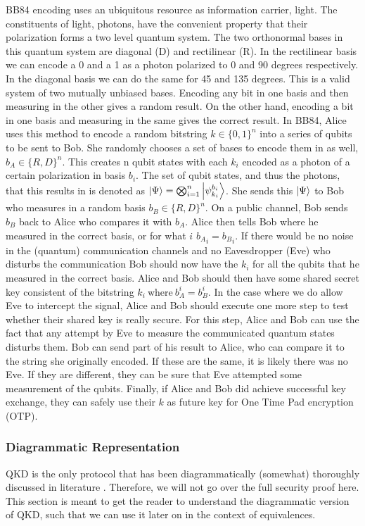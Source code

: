 \documentclass[]{article}
\begin{document}
BB84 encoding uses an ubiquitous resource as information carrier, light. The constituents of light, photons, have the convenient property that their polarization forms a two level quantum system. The two orthonormal bases in this quantum system are diagonal (D) and rectilinear (R). In the rectilinear basis we can encode a 0 and a 1 as a photon polarized to 0 and 90 degrees respectively. In the diagonal basis we can do the same for 45 and 135 degrees. This is a valid system of two mutually unbiased bases. Encoding any bit in one basis and then measuring in the other gives a random result. On the other hand, encoding a bit in one basis and measuring in the same gives the correct result. In BB84, Alice uses this method to encode a random bitstring  $k \in \{0,1\}^n $ into a series of qubits to be sent to Bob. She randomly chooses a set of bases to encode them in as well,  $b_A \in \{R, D\}^n$. This creates n qubit states with each $k_i$ encoded as a photon of a certain polarization in basis $b_i$. The set of qubit states, and thus the photons, that this results in is denoted as $\ket{\Psi} = \bigotimes_{i=1}^n \ket{\psi_{k_i}^{b_i}} $. She sends this $\ket{\Psi}$ to Bob who measures in a random basis $b_B \in \{R, D\}^n$. On a public channel, Bob sends $b_B$ back to Alice who compares it with $b_A$. Alice then tells Bob where he measured in the correct basis, or for what $i$ ${b_A}_i = {b_B}_i$. If there would be no noise in the (quantum) communication channels and no Eavesdropper (Eve) who disturbs the communication Bob should now have the $k_i$ for all the qubits that he measured in the correct basis. Alice and Bob should then have some shared secret key consistent of the bitstring $k_i ~\text{where} ~b_A^i = b_B^i$. In the case where we do allow Eve to intercept the signal, Alice and Bob should execute one more step to test whether their shared key is really secure. For this step, Alice and Bob can use the fact that any attempt by Eve to measure the communicated quantum states disturbs them. Bob can send part of his result to Alice, who can compare it to the string she originally encoded. If these are the same, it is likely there was no Eve. If they are different, they can be sure that Eve attempted some measurement of the qubits. Finally, if Alice and Bob did achieve successful key exchange, they can safely use their $k$ as future key for One Time Pad encryption (OTP).

\subsubsection{Diagrammatic Representation}
QKD is the only protocol that has been diagrammatically (somewhat) thoroughly discussed in literature \cite{Kissinger2017}. Therefore, we will not go over the full security proof here. This section is meant to get the reader to understand the diagrammatic version of QKD, such that we can use it later on in the context of equivalences.
\end{document}
